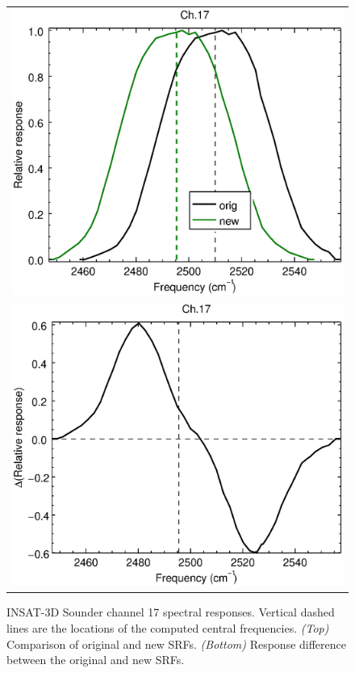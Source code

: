 \begin{figure}[H]
  \centering
  \begin{tabular}{c}
    \includegraphics[scale=0.55]{graphics/sndr/srf/sndr_insat3d-17.eps} \\
    \includegraphics[scale=0.55]{graphics/sndr/srf/sndr_insat3d-17.difference.eps}
  \end{tabular}
  \caption{INSAT-3D Sounder channel 17 spectral responses. Vertical dashed lines are the locations of the computed central frequencies. \emph{(Top)} Comparison of original and new SRFs. \emph{(Bottom)} Response difference between the original and new SRFs.}
  \label{fig:sndr_ch17}
\end{figure}


